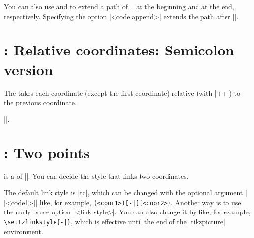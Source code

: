 You can also use \icmd{\tztosAtBegin} and \icmd{\tztosAtEnd} to extend a path of |\tztos| at the beginning and at the end, respectively.
Specifying the option |<code.append>| extends the path after |\tztosAtEnd|.

\begin{tzcode}{.3}
{}
\end{tzcode}

\section{\protect\cmd{\tztos+}: Relative coordinates: Semicolon version}
\label{s:tztos+}

The  \icmd{\tztos+} takes each coordinate (except the first coordinate) relative (with |++|) to the previous coordinate.

 |\tztos|.

\begin{tzcode}{.3}
\end{tzcode}



\section{\protect\cmd{\tzlink}: Two points}
\label{s:tzlink}

\icmd{\tzlink} is a  of |\tzline|.
You can decide the style that links two coordinates.

The default link style is |to|, which can be changed with the  optional argument |[<code1>]|  like, for example, \verb+(<coor1>)[-|](<coor2>)+.
Another way is to use the  curly brace option |{<link style>}|.
You can also change it by \icmd{\settzlinkstyle} like, for example, \verb+\settzlinkstyle{-|}+, which is effective until the end of the |tikzpicture| environment. 

